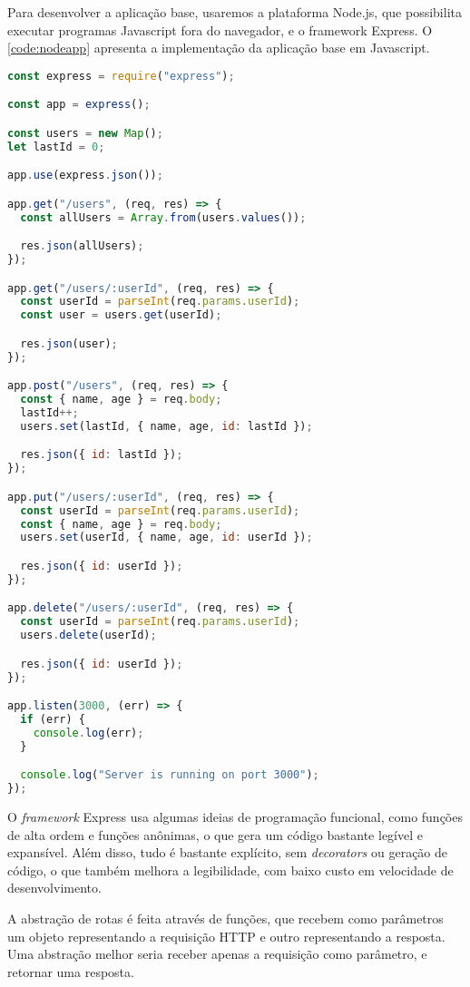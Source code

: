 Para desenvolver a aplicação base, usaremos a plataforma Node.js, que possibilita
executar programas Javascript fora do navegador, e o framework Express. O
\autoref{code:nodeapp} apresenta a implementação da aplicação base em Javascript.


\begin{lstlisting}[language=Javascript,label={code:nodeapp},caption={Aplicação base em Javascript com Express}]
const express = require("express");

const app = express();

const users = new Map();
let lastId = 0;

app.use(express.json());

app.get("/users", (req, res) => {
  const allUsers = Array.from(users.values());

  res.json(allUsers);
});

app.get("/users/:userId", (req, res) => {
  const userId = parseInt(req.params.userId);
  const user = users.get(userId);

  res.json(user);
});

app.post("/users", (req, res) => {
  const { name, age } = req.body;
  lastId++;
  users.set(lastId, { name, age, id: lastId });

  res.json({ id: lastId });
});

app.put("/users/:userId", (req, res) => {
  const userId = parseInt(req.params.userId);
  const { name, age } = req.body;
  users.set(userId, { name, age, id: userId });

  res.json({ id: userId });
});

app.delete("/users/:userId", (req, res) => {
  const userId = parseInt(req.params.userId);
  users.delete(userId);

  res.json({ id: userId });
});

app.listen(3000, (err) => {
  if (err) {
    console.log(err);
  }

  console.log("Server is running on port 3000");
});
\end{lstlisting}

O \textit{framework} Express usa algumas ideias de programação funcional, como
funções de alta ordem e funções anônimas, o que gera um código bastante legível
e expansível. Além disso, tudo é bastante explícito, sem \textit{decorators} ou
geração de código, o que também melhora a legibilidade, com baixo custo em velocidade
de desenvolvimento.

A abstração de rotas é feita através de funções, que recebem como parâmetros
um objeto representando a requisição HTTP e outro representando a resposta. Uma
abstração melhor seria receber apenas a requisição como parâmetro, e retornar uma
resposta.

